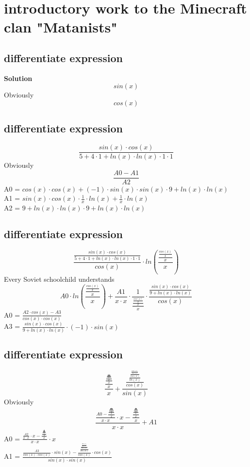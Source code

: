 \documentclass[12pt]{article}
\begin{document}
\section{introductory work to the Minecraft clan "Matanists"}
\subsection{differentiate expression}
\textbf{Solution}
$$sin(x)$$ 
Obviously \\ 
$$cos(x)$$ 
\subsection{differentiate expression}
$$\frac{sin(x) \cdot cos(x)}{5 + 4 \cdot 1 + ln(x) \cdot ln(x) \cdot 1 \cdot 1}$$ 
Obviously \\ 
$$\frac{A0 - A1}{A2}$$ 
A0 = $cos(x) \cdot cos(x) + (-1) \cdot sin(x) \cdot sin(x) \cdot 9 + ln(x) \cdot ln(x)$ \\ 
A1 = $sin(x) \cdot cos(x) \cdot \frac{1}{x} \cdot ln(x) + \frac{1}{x} \cdot ln(x)$ \\ 
A2 = $9 + ln(x) \cdot ln(x) \cdot 9 + ln(x) \cdot ln(x)$ \\ 
\subsection{differentiate expression}
$$\frac{\frac{sin(x) \cdot cos(x)}{5 + 4 \cdot 1 + ln(x) \cdot ln(x) \cdot 1 \cdot 1}}{cos(x)} \cdot ln(\frac{\frac{\frac{cos(x)}{x}}{x}}{x})$$ 
Every Soviet schoolchild understands \\ 
$$A0 \cdot ln(\frac{\frac{\frac{cos(x)}{x}}{x}}{x}) + \frac{A1}{x \cdot x} \cdot \frac{1}{\frac{\frac{\frac{cos(x)}{x}}{x}}{x}} \cdot \frac{\frac{sin(x) \cdot cos(x)}{9 + ln(x) \cdot ln(x)}}{cos(x)}$$ 
A0 = $\frac{A2 \cdot cos(x) - A3}{cos(x) \cdot cos(x)}$ \\ 
A3 = $\frac{sin(x) \cdot cos(x)}{9 + ln(x) \cdot ln(x)} \cdot (-1) \cdot sin(x)$ \\ 
\subsection{differentiate expression}
$$\frac{\frac{\frac{\frac{\frac{\frac{\frac{\frac{\frac{x}{x}}{x}}{x}}{x}}{x}}{x}}{x}}{x}}{x} + \frac{\frac{\frac{\frac{\frac{cos(x)}{sin(x)}}{cos(x)}}{ln(x)}}{cos(x)}}{sin(x)}$$ 
Obviously \\ 
$$\frac{\frac{A0 - \frac{\frac{\frac{\frac{\frac{\frac{\frac{x}{x}}{x}}{x}}{x}}{x}}{x}}{x}}{x \cdot x} \cdot x - \frac{\frac{\frac{\frac{\frac{\frac{\frac{\frac{x}{x}}{x}}{x}}{x}}{x}}{x}}{x}}{x}}{x \cdot x} + A1$$ 
A0 = $\frac{\frac{A2}{x \cdot x} \cdot x - \frac{\frac{\frac{\frac{\frac{\frac{x}{x}}{x}}{x}}{x}}{x}}{x}}{x \cdot x} \cdot x$ \\ 
A1 = $\frac{\frac{A3}{cos(x) \cdot cos(x)} \cdot sin(x) - \frac{\frac{\frac{\frac{cos(x)}{sin(x)}}{cos(x)}}{ln(x)}}{cos(x)} \cdot cos(x)}{sin(x) \cdot sin(x)}$ \\ 
\end{document}
